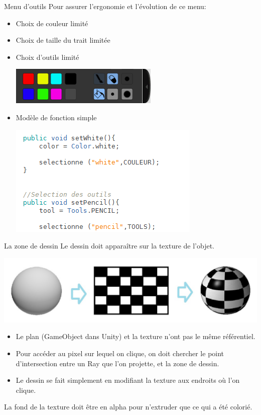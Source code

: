 \documentclass[a4paper,10pt]{beamer}
\begin{document}
	\begin{frame}{Menu d'outils}
		Pour assurer l'ergonomie et l'évolution de ce menu:
			\begin{itemize}
				\item Choix de couleur limité
				\item Choix de taille du trait limitée
				\item Choix d'outils limité
					\centerline{\includegraphics[scale=0.4]{images/Nono/img7.png}} 
				\item Modèle de fonction simple
							\centerline{\includegraphics[scale=0.6]{images/Nono/img8.png}} 
			\end{itemize}


	\end{frame}
	
	\begin{frame}{La zone de dessin}
		Le dessin doit apparaître sur la texture de l'objet.
			\centerline{\includegraphics[scale=0.4]{images/intro/spheres.jpg}}
			
			\begin{itemize}
				\item Le plan (GameObject dans Unity) et la texture n'ont pas le même référentiel. 
				\item Pour accéder au pixel sur lequel on clique, on doit chercher le point d'intersection entre un Ray que l'on projette, et la zone de dessin.
				\item Le dessin se fait simplement en modifiant la texture aux endroits où  l'on clique.
			\end{itemize} 
		La fond de la texture doit être en alpha pour n'extruder que ce qui a été colorié.
	\end{frame}
	
\end{document}
